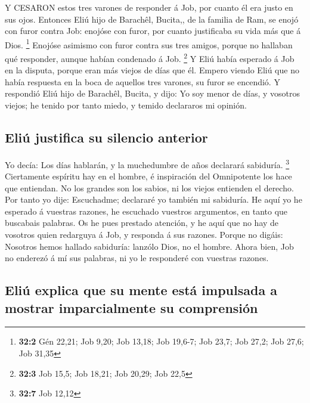  Y CESARON estos tres varones de responder á Job, por cuanto
él era justo en sus ojos.  Entonces Eliú hijo de Barachêl,
Bucita,, de la familia de Ram, se enojó con furor contra Job: enojóse
con furor, por cuanto justificaba su vida más que á Dios. \footnote{\textbf{32:2}
  Gén 22,21; Job 9,20; Job 13,18; Job 19,6-7; Job 23,7; Job 27,2; Job
  27,6; Job 31,35}  Enojóse asimismo con furor contra sus
tres amigos, porque no hallaban qué responder, aunque habían condenado á
Job. \footnote{\textbf{32:3} Job 15,5; Job 18,21; Job 20,29; Job 22,5}
 Y Eliú había esperado á Job en la disputa, porque eran más
viejos de días que él.  Empero viendo Eliú que no había
respuesta en la boca de aquellos tres varones, su furor se encendió.
 Y respondió Eliú hijo de Barachêl, Bucita, y dijo: Yo soy
menor de días, y vosotros viejos; he tenido por tanto miedo, y temido
declararos mi opinión.

\hypertarget{eliuxfa-justifica-su-silencio-anterior}{%
\subsection{Eliú justifica su silencio
anterior}\label{eliuxfa-justifica-su-silencio-anterior}}

 Yo decía: Los días hablarán, y la muchedumbre de años
declarará sabiduría. \footnote{\textbf{32:7} Job 12,12} 
Ciertamente espíritu hay en el hombre, é inspiración del Omnipotente los
hace que entiendan.  No los grandes son los sabios, ni los
viejos entienden el derecho.  Por tanto yo dije:
Escuchadme; declararé yo también mi sabiduría.  He aquí yo
he esperado á vuestras razones, he escuchado vuestros argumentos, en
tanto que buscabais palabras.  Os he pues prestado
atención, y he aquí que no hay de vosotros quien redarguya á Job, y
responda á sus razones.  Porque no digáis: Nosotros hemos
hallado sabiduría: lanzólo Dios, no el hombre.  Ahora bien,
Job no enderezó á mí sus palabras, ni yo le responderé con vuestras
razones.

\hypertarget{eliuxfa-explica-que-su-mente-estuxe1-impulsada-a-mostrar-imparcialmente-su-comprensiuxf3n}{%
\subsection{Eliú explica que su mente está impulsada a mostrar
imparcialmente su
comprensión}\label{eliuxfa-explica-que-su-mente-estuxe1-impulsada-a-mostrar-imparcialmente-su-comprensiuxf3n}}

